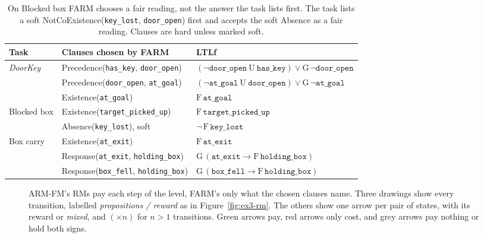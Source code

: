\documentclass[11pt,english,listoffigures,listoftables]{tfgetsinf}
\newcommand{\env}[1]{\textsf{\slshape #1}}  %
\begin{document}
\begin{table}[H]
\centering
\footnotesize
\renewcommand{\arraystretch}{1.2}
\begin{tabularx}{\textwidth}{@{}l>{\raggedright\arraybackslash}p{5.4cm}>{\raggedright\arraybackslash}X@{}}
\toprule
\textbf{Task} & \textbf{Clauses chosen by FARM} & \textbf{LTLf} \\ \midrule
\env{DoorKey} & Precedence(\texttt{has\_key}, \texttt{door\_open}) & $(\neg\texttt{door\_open}\ \mathrm{U}\ \texttt{has\_key}) \lor \mathrm{G}\,\neg\texttt{door\_open}$ \\
  & Precedence(\texttt{door\_open}, \texttt{at\_goal}) & $(\neg\texttt{at\_goal}\ \mathrm{U}\ \texttt{door\_open}) \lor \mathrm{G}\,\neg\texttt{at\_goal}$ \\
  & Existence(\texttt{at\_goal}) & $\mathrm{F}\,\texttt{at\_goal}$ \\ \midrule
Blocked box & Existence(\texttt{target\_picked\_up}) & $\mathrm{F}\,\texttt{target\_picked\_up}$ \\
  & Absence(\texttt{key\_lost}), soft & $\neg\,\mathrm{F}\,\texttt{key\_lost}$ \\ \midrule
Box carry & Existence(\texttt{at\_exit}) & $\mathrm{F}\,\texttt{at\_exit}$ \\
  & Response(\texttt{at\_exit}, \texttt{holding\_box}) & $\mathrm{G}\,(\texttt{at\_exit} \rightarrow \mathrm{F}\,\texttt{holding\_box})$ \\
  & Response(\texttt{box\_fell}, \texttt{holding\_box}) & $\mathrm{G}\,(\texttt{box\_fell} \rightarrow \mathrm{F}\,\texttt{holding\_box})$ \\ \bottomrule
\end{tabularx}
\caption[Clauses of the example tasks]{On Blocked box FARM chooses a fair reading, not the answer the task lists first. The task lists a soft \mbox{NotCoExistence}(\texttt{key\_lost}, \texttt{door\_open}) first and accepts the soft Absence as a fair reading. Clauses are hard unless marked soft.}
\label{tab:res-ex-clauses}
\end{table}

\begin{figure}[!t]
\centering

\caption[Drawings of the example tasks' RMs]{ARM-FM's RMs pay each step of the level, FARM's only what the chosen clauses name. Three drawings show every transition, labelled \textit{propositions / reward} as in Figure~\ref{fig:ex3-rm}. The others show one arrow per pair of states, with its reward or \textit{mixed}, and $(\times n)$ for $n > 1$ transitions. Green arrows pay, red arrows only cost, and grey arrows pay nothing or hold both signs.}
\label{fig:res-ex-machines}
\end{figure}
\end{document}

